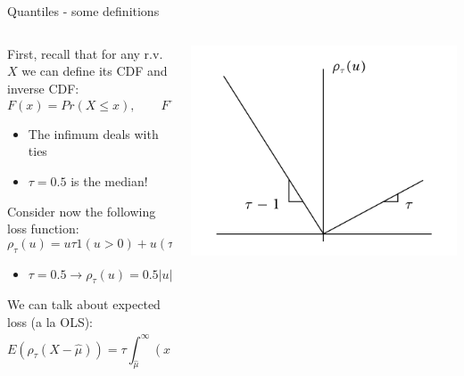 \documentclass[notes,11pt, aspectratio=169]{beamer}
\newenvironment{wideitemize}{\itemize\addtolength{\itemsep}{10pt}}{\enditemize}
\begin{document}
\begin{frame}{Quantiles - some definitions}
  \begin{columns}[T] %
\begin{column}{.7\textwidth}
  \begin{wideitemize}
  \item First, recall that for any r.v. $X$ we can define its CDF and inverse CDF:
    $$F(x) = Pr(X \leq x), \qquad F^{-1}(\tau) = \inf\{x : F(x) \geq \tau\}$$
    \begin{itemize}
    \vspace{-15pt}      
    \item The infimum deals with ties
    \item $\tau = 0.5$ is the median!
    \end{itemize}
  \item Consider now the following loss function:
    $$ \rho_{\tau}(u) = u \tau 1(u > 0) + u(\tau-1) 1(u <0) = u(\tau - 1(u<0))$$
    \vspace{-15pt}
    \begin{itemize}
    \item $\tau = 0.5 \longrightarrow \rho_{\tau}(u) = 0.5|u|$
    \end{itemize}
  \item We can talk about expected loss (a la  OLS):
    $$ E(\rho_\tau(X - \hat{\mu})) = \tau \int_{\hat{\mu}}^{\infty} (x - \hat{\mu}) dF(x) + (1-\tau) \int^{\hat{\mu}}_{-\infty} (x - \hat{\mu}) dF(x)$$
  \end{wideitemize}
  \end{column}%
  \hfill%
  \begin{column}{.3\textwidth}
    \includegraphics[width=\linewidth]{check_fn.png}
  \end{column}
\end{columns}
\end{frame}
\end{document}
